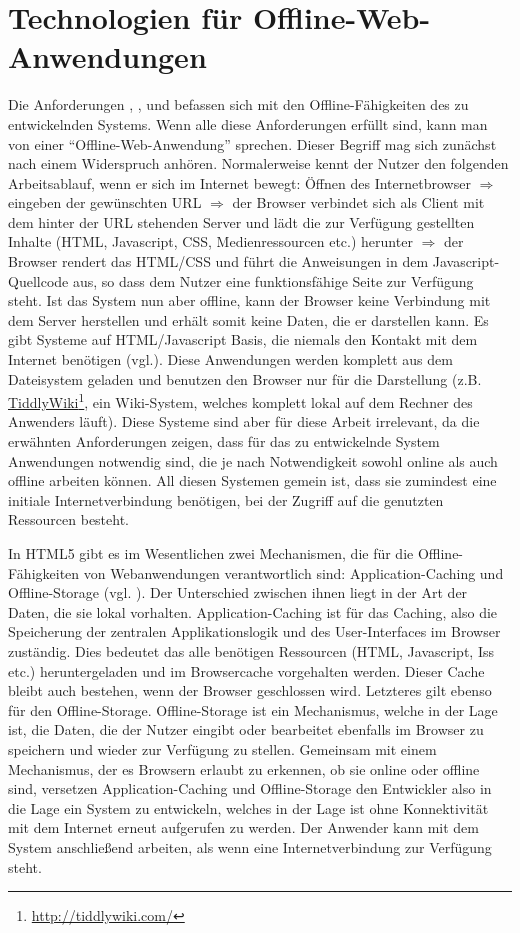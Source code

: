 \section{Technologien für Offline-Web-Anwendungen}
Die Anforderungen , ,  und  befassen sich mit den Offline-Fähigkeiten des zu entwickelnden Systems. Wenn alle diese Anforderungen erfüllt sind, kann man von einer "`Offline-Web-Anwendung"' sprechen. Dieser Begriff mag sich zunächst nach einem Widerspruch anhören. Normalerweise kennt der Nutzer den folgenden Arbeitsablauf, wenn er sich im Internet bewegt: Öffnen des Internetbrowser $\Rightarrow$ eingeben der gewünschten URL $\Rightarrow$ der Browser verbindet sich als Client mit dem hinter der URL stehenden Server und lädt die zur Verfügung gestellten Inhalte (HTML, Javascript, CSS, Medienressourcen etc.) herunter $\Rightarrow$ der Browser rendert das HTML/CSS und führt die Anweisungen in dem Javascript-Quellcode aus, so dass dem Nutzer eine funktionsfähige Seite zur Verfügung steht. Ist das System nun aber offline, kann der Browser keine Verbindung mit dem Server herstellen und erhält somit keine Daten, die er darstellen kann. Es gibt Systeme auf HTML/Javascript Basis, die niemals den Kontakt mit dem Internet benötigen (vgl.\cite{Mahemoff22010}). Diese Anwendungen werden komplett aus dem Dateisystem geladen und benutzen den Browser nur für die Darstellung (z.B. \href{http://tiddlywiki.com}{TiddlyWiki}\footnote{\url{http://tiddlywiki.com/}}, ein Wiki-System, welches komplett lokal auf dem Rechner des Anwenders läuft). Diese Systeme sind aber für diese Arbeit irrelevant, da die erwähnten Anforderungen zeigen, dass für das zu entwickelnde System Anwendungen notwendig sind, die je nach Notwendigkeit sowohl online als auch offline arbeiten können. All diesen Systemen gemein ist, dass sie zumindest eine initiale Internetverbindung benötigen, bei der Zugriff auf die genutzten Ressourcen besteht.

In HTML5 gibt es im Wesentlichen zwei Mechanismen, die für die Offline-Fähigkeiten von Webanwendungen verantwortlich sind: Application-Caching und Offline-Storage (vgl. \cite{Mahemoff22010}). Der Unterschied zwischen ihnen liegt in der Art der Daten, die sie lokal vorhalten. Application-Caching ist für das Caching, also die Speicherung der zentralen Applikationslogik und des User-Interfaces im Browser zuständig. Dies bedeutet das alle benötigen Ressourcen (HTML, Javascript, Iss etc.) heruntergeladen und im Browsercache vorgehalten werden. Dieser Cache bleibt auch bestehen, wenn der Browser geschlossen wird. Letzteres gilt ebenso für den Offline-Storage. Offline-Storage ist ein Mechanismus, welche in der Lage ist, die Daten, die der Nutzer eingibt oder bearbeitet ebenfalls im Browser zu speichern und wieder zur Verfügung zu stellen. Gemeinsam mit einem Mechanismus, der es Browsern erlaubt zu erkennen, ob sie online oder offline sind, versetzen Application-Caching und Offline-Storage den Entwickler also in die Lage ein System zu entwickeln, welches in der Lage ist ohne Konnektivität mit dem Internet erneut aufgerufen zu werden. Der Anwender kann mit dem System anschließend arbeiten, als wenn eine Internetverbindung zur Verfügung steht.

